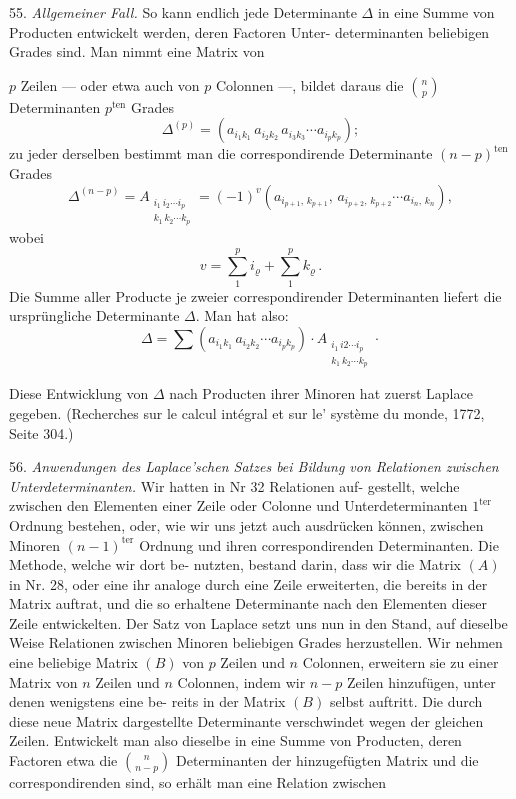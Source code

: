 \documentclass[11pt]{article}
\providecommand{\weberpage}[1]{}
\let\Delta\varDelta
\begin{document}
55. \textit{Allgemeiner Fall.} So kann endlich jede Determinante $\Delta$ in
eine Summe von Producten entwickelt werden, deren Factoren Unter-
determinanten beliebigen Grades sind. Man nimmt eine Matrix von


\weberpage{62}
$p$ Zeilen — oder etwa auch von $p$ Colonnen —, bildet daraus die
$\binom{n}{p}$ Determinanten $p^{\text{ten}}$ Grades
\[
\Delta^{(p)} = \left(a_{i_1k_1}\, a_{i_2k_2}\, a_{i_3k_3}\cdots a_{i_pk_p}\right);
\]
zu jeder derselben bestimmt man die correspondirende Determinante
$(n-p)^{\text{ten}}$ Grades
\[
\Delta^{(n-p)} = A_{\substack{i_1\,i_2\cdots i_p\\ k_1\,k_2\cdots k_p}} = (-1)^{v}\left(a_{i_{p+1},\,k_{p+1}},\, a_{i_{p+2},\,k_{p+2}}\cdots a_{i_n,\,k_n}\right),
\]
wobei
\[
v = \sum_1^p i_\varrho + \sum_1^p k_\varrho \, .
\]
Die Summe aller Producte je zweier correspondirender Determinanten
liefert die ursprüngliche Determinante $\Delta$. Man hat also:
\[
\Delta = \sum \left(a_{i_1k_1}\, a_{i_2k_2}\cdots a_{i_pk_p}\right) \cdot A_{\substack{i_1\,i2\cdots i_p\\ k_1\,k_2\cdots k_p}} \cdot
\]

Diese Entwicklung von $\Delta$ nach Producten ihrer Minoren hat zuerst
Laplace gegeben. (Recherches sur le calcul intégral et sur le' système %
du monde, 1772, Seite 304.)

56. \textit{Anwendungen des Laplace'schen Satzes bei Bildung von Relationen
zwischen Unterdeterminanten.} Wir hatten in Nr 32 Relationen auf-
gestellt, welche zwischen den Elementen einer Zeile oder Colonne und
Unterdeterminanten $1^{\text{ter}}$ Ordnung bestehen, oder, wie wir uns jetzt auch
ausdrücken können, zwischen Minoren $(n-1)^{\text{ter}}$ Ordnung und ihren
correspondirenden Determinanten. Die Methode, welche wir dort be-
nutzten, bestand darin, dass wir die Matrix $(A)$ in Nr. 28, oder eine
ihr analoge durch eine Zeile erweiterten, die bereits in der Matrix
auftrat, und die so erhaltene Determinante nach den Elementen dieser
Zeile entwickelten. Der Satz von Laplace setzt uns nun in den Stand,
auf dieselbe Weise Relationen zwischen Minoren beliebigen Grades
herzustellen. Wir nehmen eine beliebige Matrix $(B)$ von $p$ Zeilen und
$n$ Colonnen, erweitern sie zu einer Matrix von $n$ Zeilen und $n$ Colonnen,
indem wir $n-p$ Zeilen hinzufügen, unter denen wenigstens eine be-
reits in der Matrix $(B)$ selbst auftritt. Die durch diese neue Matrix
dargestellte Determinante verschwindet wegen der gleichen Zeilen.
Entwickelt man also dieselbe in eine Summe von Producten, deren
Factoren etwa die $\binom{n}{n-p}$ Determinanten der hinzugefügten Matrix
und die correspondirenden sind, so erhält man eine Relation zwischen
\end{document}
